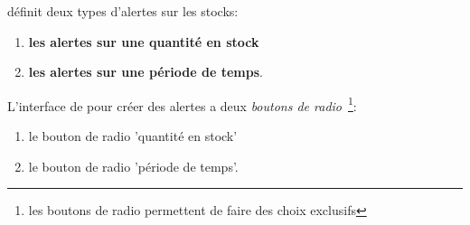 \yeren d\'efinit deux types d'alertes sur les stocks:
\begin{enumerate}[1)]
	\item \textbf{les alertes sur une quantit\'e en stock}
	\item \textbf{les alertes sur une p\'eriode de temps}.\\
\end{enumerate}

L'interface de \yeren pour cr\'eer des alertes a deux
\emph{boutons de radio}~\footnote{les boutons de radio
	permettent de faire des choix exclusifs}:

\begin{enumerate}[1)]
	\item le bouton de radio 'quantit\'e en stock'
	\item le bouton de radio 'p\'eriode de temps'.
\end{enumerate}


\newpage
{}\label{sec:alerte-quantite-stock}

